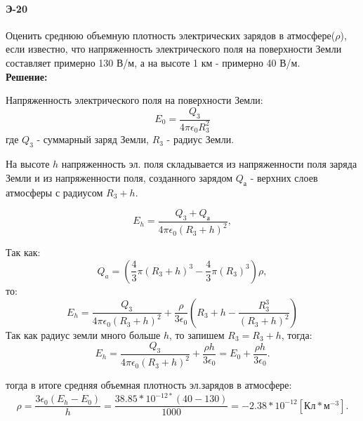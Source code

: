 \documentclass[__main__.tex]{subfiles}
\begin{document}
\paragraph{Э-20}
Оценить среднюю объемную плотность электрических зарядов в атмосфере($\rho$), если известно, что напряженность электрического поля на поверхности Земли составляет примерно 130 В/м, а на высоте 1 км - примерно 40 В/м.\\

\textbf{Решение:}

Напряженность электрического поля на поверхности Земли:
\begin{equation}
    E_{0}=\frac{Q_{3}}{4\pi\epsilon_{0} R^2_{3}}
\end{equation}
где $Q_{3}$ - суммарный заряд Земли, $R_{3}$ - радиус Земли.

На высоте $h$ напряженность эл. поля складывается из напряженности поля заряда Земли и из напряженности поля, созданного зарядом $Q_{а}$ - верхних слоев атмосферы с радиусом  $R_{3}+h$.

\begin{equation}
    E_{h}=\frac{Q_{3}+Q_{а}}{4\pi \epsilon_{0} (R_{3}+h)^{2}},
\end{equation}

Так как:
\begin{equation}
    Q_{a}=(\frac{4}{3}\pi (R_{3}+h)^{3}-\frac{4}{3}\pi (R_{3})^{3})\rho,
\end{equation}
то:
\begin{equation}
    E_{h}=\frac{Q_{3}}{4\pi \epsilon_{0} (R_{3}+h)^{2}}+\frac{\rho}{3\epsilon_{0}}(R_{3}+h-\frac{R_{3}^{3}}{(R_{3}+h)^{2}})
\end{equation}
Так как радиус земли много больше $h$, то запишем $R_{3}=R_{3}+h$, тогда:
\begin{equation}
    E_{h}=\frac{Q_{3}}{4\pi \epsilon_{0} (R_{3}+h)^{2}}+\frac{\rho h}{3\epsilon_{0}}=E_{0}+\frac{\rho h}{3\epsilon_{0}}.
\end{equation}

тогда в итоге средняя объемная плотность эл.зарядов в атмосфере:
\begin{equation}
    \rho=\frac{3\epsilon_{0}(E_{h}-E_{0})}{h}=\frac{3 8.85*10^{-12*}(40-130)}{1000}=-2.38*10^{-12}[Кл * м^{-3}].
\end{equation}
\end{document}
